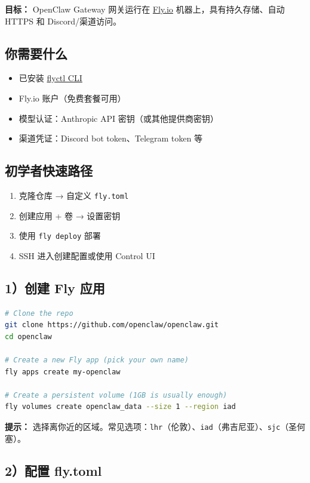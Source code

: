 \textbf{目标：} OpenClaw Gateway 网关运行在 \href{https://fly.io}{Fly.io} 机器上，具有持久存储、自动 HTTPS 和 Discord/渠道访问。

\subsection{你需要什么}


\begin{itemize}
  \item 已安装 \href{https://fly.io/docs/hands-on/install-flyctl/}{flyctl CLI}
  \item Fly.io 账户（免费套餐可用）
  \item 模型认证：Anthropic API 密钥（或其他提供商密钥）
  \item 渠道凭证：Discord bot token、Telegram token 等
\end{itemize}


\subsection{初学者快速路径}


\begin{enumerate}
  \item 克隆仓库 → 自定义 \texttt{fly.toml}
  \item 创建应用 + 卷 → 设置密钥
  \item 使用 \texttt{fly deploy} 部署
  \item SSH 进入创建配置或使用 Control UI
\end{enumerate}


\subsection{1）创建 Fly 应用}


\begin{lstlisting}[language=bash]
# Clone the repo
git clone https://github.com/openclaw/openclaw.git
cd openclaw

# Create a new Fly app (pick your own name)
fly apps create my-openclaw

# Create a persistent volume (1GB is usually enough)
fly volumes create openclaw_data --size 1 --region iad
\end{lstlisting}


\textbf{提示：} 选择离你近的区域。常见选项：\texttt{lhr}（伦敦）、\texttt{iad}（弗吉尼亚）、\texttt{sjc}（圣何塞）。

\subsection{2）配置 fly.toml}


